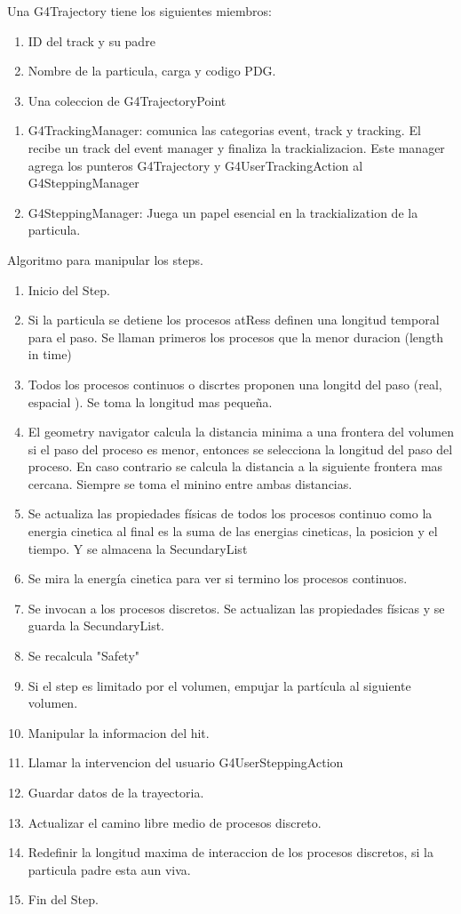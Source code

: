 \documentclass[10pt,a4paper,oneside]{book}
\begin{document}
Una G4Trajectory tiene los siguientes miembros:
\begin{enumerate}
\item ID del track y su padre
\item Nombre de la particula, carga y codigo PDG.
\item Una coleccion de G4TrajectoryPoint
\end{enumerate}

\begin{enumerate}
\item G4TrackingManager: comunica las categorias event, track y
  tracking. El recibe un track del event manager y finaliza la
  trackializacion. Este manager agrega los punteros G4Trajectory y
  G4UserTrackingAction al G4SteppingManager
\item G4SteppingManager: Juega un papel esencial en la trackialization
  de la particula.
\end{enumerate}

Algoritmo para manipular los steps.
\begin{enumerate}
\item Inicio del Step.
\item Si la particula se detiene los procesos atRess definen una
  longitud temporal para el paso. Se llaman primeros los procesos que
  la menor duracion (length in time)
\item Todos los procesos continuos o discrtes proponen una longitd del
  paso (real, espacial ). Se toma la longitud mas pequeña.
\item El geometry navigator calcula la distancia minima a una frontera
  del volumen si el paso del proceso es menor, entonces se selecciona
  la longitud del paso del proceso. En caso contrario se calcula la
  distancia a la siguiente frontera mas cercana. Siempre se toma el
  minino entre ambas distancias.
\item Se actualiza las propiedades físicas de todos los procesos
  continuo como la energia cinetica al final es la suma de las
  energias cineticas, la posicion y el tiempo. Y se almacena la
  SecundaryList
\item Se mira la energía cinetica para ver si termino los procesos
  continuos.
\item Se invocan a los procesos discretos. Se actualizan las
  propiedades físicas y se guarda la SecundaryList.
\item Se recalcula "Safety"
\item Si el step es limitado por el volumen, empujar la partícula al siguiente volumen.
\item Manipular la informacion del hit.
\item Llamar la intervencion del usuario G4UserSteppingAction
\item Guardar datos de la trayectoria.
\item Actualizar el camino libre medio de procesos discreto.
\item Redefinir la longitud maxima de interaccion de los procesos
  discretos, si la particula padre esta aun viva.
\item Fin del Step.
\end{enumerate}
\end{document}

